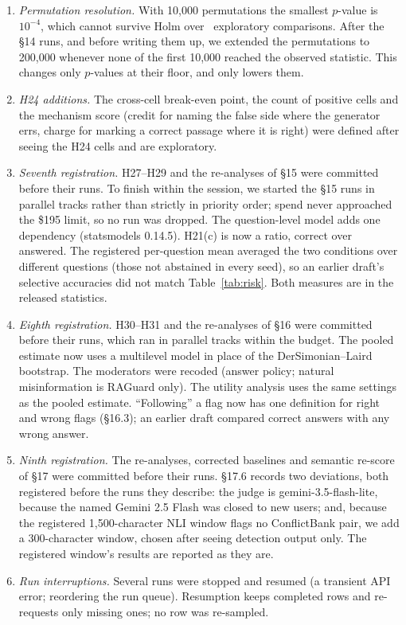 \begin{enumerate}[leftmargin=*,itemsep=1pt,topsep=2pt]
as a generator but not run, because no API key was available then. On the endpoint we used, Claude rejects a temperature and JSON mode; it
ran at its default temperature, and as a detector its JSON goes to the detector's regex fallback. The answer
parser unwraps paired tags (\texttt{<answer>X</answer>}), a format no earlier result contained.
\item \emph{Permutation resolution.} With 10,000 permutations the smallest $p$-value is $10^{-4}$, which cannot
survive Holm over \nExploratory\ exploratory comparisons. After the \S14 runs, and before writing them up, we
extended the permutations to 200,000 whenever none of the first 10,000 reached the observed statistic. This changes
only $p$-values at their floor, and only lowers them.
\item \emph{H24 additions.} The cross-cell break-even point, the count of positive cells and the mechanism score
(credit for naming the false side where the generator errs, charge for marking a correct passage where it is right)
were defined after seeing the H24 cells and are exploratory.
\item \emph{Seventh registration.} H27--H29 and the re-analyses of \S15 were committed before their runs. To finish
within the session, we started the \S15 runs in parallel tracks rather than strictly in priority order; spend never
approached the \$195 limit, so no run was dropped. The question-level model adds one dependency (statsmodels 0.14.5).
H21(c) is now a ratio, correct over answered. The registered per-question mean averaged the two conditions
over different questions (those not abstained in every seed), so an earlier draft's selective accuracies did
not match Table~\ref{tab:risk}. Both measures are in the released statistics.
\item \emph{Eighth registration.} H30--H31 and the re-analyses of \S16 were committed before their runs, which
ran in parallel tracks within the budget. The pooled estimate now uses a multilevel model in place of the
DerSimonian--Laird bootstrap. The moderators were recoded (answer policy; natural misinformation is RAGuard only).
The utility analysis uses the same settings as the pooled estimate. ``Following'' a flag now has one definition for
right and wrong flags (\S16.3); an earlier draft compared correct answers with any wrong answer.
\item \emph{Ninth registration.} The re-analyses, corrected baselines and semantic re-score of \S17 were committed
before their runs. \S17.6 records two deviations, both registered before the runs they describe: the judge is
gemini-3.5-flash-lite, because the named Gemini 2.5 Flash was closed to new users; and, because the registered
1,500-character NLI window flags no ConflictBank pair, we add a 300-character window, chosen after seeing
detection output only. The registered window's results are reported as they are.
\item \emph{Run interruptions.} Several runs were stopped and resumed (a transient API error; reordering the run
queue). Resumption keeps completed rows and re-requests only missing ones; no row was re-sampled.
\end{enumerate}

